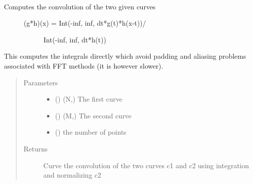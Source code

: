 \documentclass[letterpaper,10pt,english]{sphinxmanual}
\begin{document}
\begin{fulllineitems}
\label{\detokenize{pydv:pydvpy.convolveb}}~\begin{description}
\item[{Computes the convolution of the two given curves}] \leavevmode\begin{description}
\item[{(g*h)(x) = Int(-inf, inf, dt*g(t)*h(x-t))/}] \leavevmode
Int(-inf, inf, dt*h(t))

\end{description}

\end{description}

This computes the integrals directly which avoid padding and aliasing
problems associated with FFT methods (it is however slower).
\begin{quote}\begin{description}
\item[{Parameters}] \leavevmode\begin{itemize}
\item {} 
 ({\hyperref[\detokenize{pydv:curve.Curve}]{}}) \textendash{} (N,) The first curve

\item {} 
 ({\hyperref[\detokenize{pydv:curve.Curve}]{}}) \textendash{} (M,) The second curve

\item {} 
 () \textendash{} the number of points

\end{itemize}

\item[{Returns}] \leavevmode
Curve \textendash{} the convolution of the two curves c1 and c2 using integration and normalizing c2

\end{description}\end{quote}

\end{fulllineitems}

\end{document}

